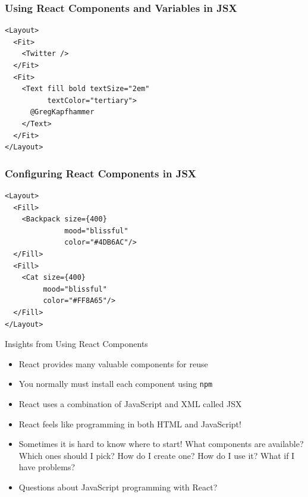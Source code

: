 \documentclass[14pt,aspectratio=169]{beamer}
\begin{document}
%
\begin{frame}[fragile]
  \frametitle{Using React Components and Variables in JSX}
  \normalsize
  \hspace*{.1in}
  \begin{minipage}{6in}
    \vspace*{.2in}
    \begin{verbatim}
<Layout>
  <Fit>
    <Twitter />
  </Fit>
  <Fit>
    <Text fill bold textSize="2em"
          textColor="tertiary">
      @GregKapfhammer
    </Text>
  </Fit>
</Layout>
    \end{verbatim}
  \end{minipage}
\end{frame}

%
\begin{frame}[fragile]
  \frametitle{Configuring React Components in JSX}
  \normalsize
  \hspace*{.1in}
  \begin{minipage}{6in}
    \vspace*{.1in}
    \begin{verbatim}
<Layout>
  <Fill>
    <Backpack size={400}
              mood="blissful"
              color="#4DB6AC"/>
  </Fill>
  <Fill>
    <Cat size={400}
         mood="blissful"
         color="#FF8A65"/>
  </Fill>
</Layout>
    \end{verbatim}
  \end{minipage}
\end{frame}

%
\begin{frame}{Insights from Using React Components}
  \begin{itemize}
    \item React provides many valuable components for reuse
      \vspace*{-.15in}
    \item You normally must install each component using {\tt npm}
      \vspace*{-.15in}
    \item React uses a combination of JavaScript and XML called JSX
      \vspace*{-.35in}
    \item React feels like programming in both HTML and JavaScript!
      \vspace*{-.35in}
    \item Sometimes it is hard to know where to start! What components are
      available? Which ones should I pick? How do I create one? How do I use it?
      What if I have problems?
      \vspace*{-.15in}
    \item Questions about JavaScript programming with React?
  \end{itemize}
\end{frame}
\end{document}
